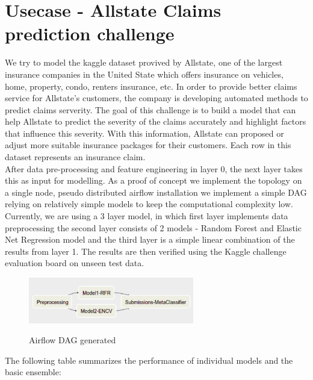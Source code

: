 \documentclass[10pt,onecolumn]{IEEEtran}
\begin{document}
\section{Usecase - Allstate Claims prediction challenge}

We try to model the kaggle dataset provived by Allstate, one of the largest insurance companies in the United State which offers insurance on vehicles, home, property, condo, renters insurance, etc. In order to provide better claims service for Allstate’s customers, the company is developing automated methods to predict claims serverity. The goal of this challenge is to build a model that can help Allstate to predict the severity of the claims accurately and highlight factors that influence this severity. With this information, Allstate can proposed or adjust more suitable insurance packages for their customers.
Each row in this dataset represents an insurance claim. \\ 
After data pre-processing and feature engineering in layer 0, the next layer takes this as input for modelling. As a proof of concept we implement the topology on a single node, pseudo distributed airflow installation we implement a simple DAG relying on relatively simple models to keep the computational complexity low. \\
Currently, we are using a 3 layer model, in which first layer implements data preprocessing the second layer consists of 2 models - Random Forest and Elastic Net Regression model and the third layer is a simple linear combination of the results from layer 1. The results are then verified using the Kaggle challenge evaluation board on unseen test data. 

\begin{figure}[!htb]
\centering
\caption{Airflow DAG generated}
\includegraphics[height=2cm]{images/sample_DAG.png} \\

\end{figure} 
The following table summarizes the performance of individual models and the basic ensemble: \\
\end{document}
